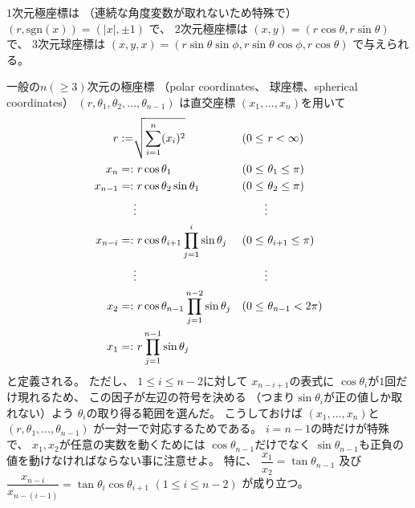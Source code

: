 $1$次元極座標は
（連続な角度変数が取れないため特殊で）
$(r, \mathrm{sgn}(x)) = (|x|, \pm 1)$
で、
$2$次元極座標は
$(x, y) = (r \cos \theta, r \sin \theta)$
で、
$3$次元球座標は
$(x, y, x)
=
    (r \sin \theta \sin \phi,
    r \sin \theta \cos \phi,
    r \cos \theta)$
で与えられる。

一般の$n (\ge 3)$次元の極座標
（polar coordinates、
球座標、spherical coordinates）
$(r, \theta_1, \theta_2,
\dots, \theta_{n-1})$
は直交座標
$(x_1, \dots, x_n)$を用いて
\begin{subequations}
\begin{align}
    r :=& \sqrt{
        \sum_{i=1}^n
        (x_i)^2
    }
&
    (0 \le\ &r < \infty)
\\
    x_n
    =:&\ 
    r \cos \theta_1
&
    (0 \le\ &\theta_1 \le \pi)
\\
    x_{n-1}
    =:&\ 
    r \cos \theta_2
    \sin \theta_1
&
    (0 \le\ &\theta_2 \le \pi)
\\\notag
    &
    \vdots
    &
    \vdots
\\
    x_{n-i}
    =:&\ 
    r
    \cos \theta_{i+1}
    \prod_{j=1}^{i}
    \sin \theta_j
&
    (0 \le\ &\theta_{i+1} \le \pi)
\\\notag
    &
    \vdots
    &
    \vdots
\\
    x_{2}
    =:&\ 
    r
    \cos \theta_{n-1}
    \prod_{j=1}^{n-2}
    \sin \theta_j
&
    (0 \le\ &\theta_{n-1} < 2 \pi)
\\
    x_{1}
    =:&\ 
    r
    \prod_{j=1}^{n-1}
    \sin \theta_j
\end{align}
\label{n dimensional spherical coordinates}
\end{subequations}
と定義される。
ただし、
$1 \le i \le n-2$に対して
$x_{n-i+1}$の表式に
$\cos \theta_i$が$1$回だけ現れるため、
この因子が左辺の符号を決める
（つまり$\sin \theta_i$が正の値しか取れない）よう
$\theta_i$の取り得る範囲を選んだ。
こうしておけば
$(x_1, \dots, x_n)$と
$(r, \theta_1, \dots, \theta_{n-1})$
が一対一で対応するためである。
$i = n - 1$の時だけが特殊で、
$x_1, x_2$が任意の実数を動くためには
$\cos \theta_{n-1}$だけでなく
$\sin \theta_{n-1}$も正負の値を動けなければならない事に注意せよ。
特に、
$\dfrac
    { x_{1} }
    { x_{2} }
=
    \tan \theta_{n-1}
$
及び
$
\dfrac
    { x_{n - i} }
    { x_{n - (i - 1)} }
=
    \tan \theta_{i}
    \cos \theta_{i+1}
$
$(1 \le i \le n - 2)$
が成り立つ。

